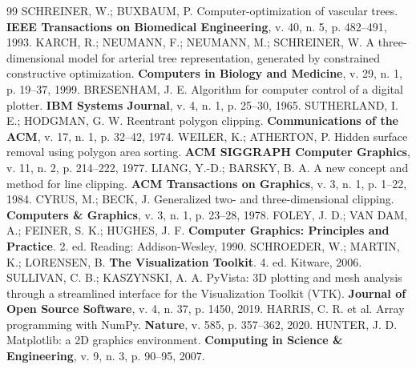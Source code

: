 \documentclass[11pt, a4paper]{article}
\begin{document}
\begin{thebibliography}{99}
   SCHREINER, W.; BUXBAUM, P. Computer-optimization of vascular trees. \textbf{IEEE Transactions on Biomedical Engineering}, v. 40, n. 5, p. 482--491, 1993.
   KARCH, R.; NEUMANN, F.; NEUMANN, M.; SCHREINER, W. A three-dimensional model for arterial tree representation, generated by constrained constructive optimization. \textbf{Computers in Biology and Medicine}, v. 29, n. 1, p. 19--37, 1999.
   BRESENHAM, J. E. Algorithm for computer control of a digital plotter. \textbf{IBM Systems Journal}, v. 4, n. 1, p. 25--30, 1965.
   SUTHERLAND, I. E.; HODGMAN, G. W. Reentrant polygon clipping. \textbf{Communications of the ACM}, v. 17, n. 1, p. 32--42, 1974.
   WEILER, K.; ATHERTON, P. Hidden surface removal using polygon area sorting. \textbf{ACM SIGGRAPH Computer Graphics}, v. 11, n. 2, p. 214--222, 1977.
   LIANG, Y.-D.; BARSKY, B. A. A new concept and method for line clipping. \textbf{ACM Transactions on Graphics}, v. 3, n. 1, p. 1--22, 1984.
   CYRUS, M.; BECK, J. Generalized two- and three-dimensional clipping. \textbf{Computers \& Graphics}, v. 3, n. 1, p. 23--28, 1978.
   FOLEY, J. D.; VAN DAM, A.; FEINER, S. K.; HUGHES, J. F. \textbf{Computer Graphics: Principles and Practice}. 2. ed. Reading: Addison-Wesley, 1990.
   SCHROEDER, W.; MARTIN, K.; LORENSEN, B. \textbf{The Visualization Toolkit}. 4. ed. Kitware, 2006.
   SULLIVAN, C. B.; KASZYNSKI, A. A. PyVista: 3D plotting and mesh analysis through a streamlined interface for the Visualization Toolkit (VTK). \textbf{Journal of Open Source Software}, v. 4, n. 37, p. 1450, 2019.
   HARRIS, C. R. et al. Array programming with NumPy. \textbf{Nature}, v. 585, p. 357--362, 2020.
   HUNTER, J. D. Matplotlib: a 2D graphics environment. \textbf{Computing in Science \& Engineering}, v. 9, n. 3, p. 90--95, 2007.
\end{thebibliography}
\end{document}
